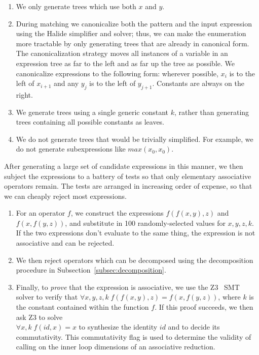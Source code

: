 \begin{enumerate}
\item We only generate trees which use both $x$ and $y$.
\item During matching we canonicalize both the pattern and the input expression using the Halide simplifier and solver; thus, we can make the enumeration more tractable by only generating trees that are already in canonical form.  The canonicalization strategy moves all instances of a variable in an expression tree as far to the left and as far up the tree as possible. We canonicalize expressions to the following form: wherever possible, $x_i$ is to the left of $x_{i+1}$ and any $y_j$ is to the left of $y_{j+1}$. Constants are always on the right.
\item We generate trees using a single generic constant $k$, rather than generating trees containing all possible constants as leaves.
\item We do not generate trees that would be trivially simplified. For example, we do not generate subexpressions like $max(x_0, x_0)$.
\end{enumerate}

After generating a large set of candidate expressions in this manner, we then subject the expressions to a battery of tests so that only elementary associative operators remain. The tests are arranged in increasing order of expense, so that we can cheaply reject most expressions.

\begin{enumerate}
\item For an operator $f$, we construct the expressions $f(f(x, y), z)$ and $f(x, f(y, z))$, and substitute in 100 randomly-selected values for $x, y, z, k$. If the two expressions don't evaluate to the same thing, the expression is not associative and can be rejected.
\item We then reject operators which can be decomposed using the decomposition procedure in Subsection~\ref{subsec:decomposition}.
\item Finally, to \emph{prove} that the expression is associative, we use the Z3~\cite{DeMoura:2008:ZES:1792734.1792766} SMT solver to verify that $\forall x, y, z, k \;f(f(x, y), z) = f(x, f(y, z))$, where $k$ is the constant contained within the function $f$. If this proof succeeds, we then ask Z3 to solve\\ $\forall x, k \;f(id, x) = x$ to synthesize the identity $id$ and to decide its commutativity. This commutativity flag is used to determine the validity of calling  on the inner loop dimensions of an associative reduction.
\end{enumerate}

